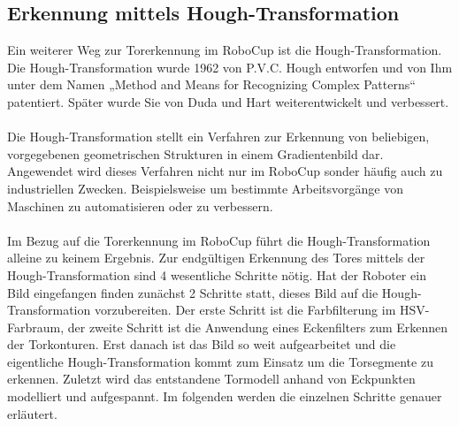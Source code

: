 \documentclass[a4paper,12pt]{article}
\begin{document}
\subsection{Erkennung mittels Hough-Transformation}
Ein weiterer Weg zur Torerkennung im RoboCup ist die Hough-Transformation.
Die Hough-Transformation wurde 1962 von P.V.C. Hough entworfen und von Ihm unter dem Namen
„Method and Means for Recognizing Complex Patterns“ patentiert. Später wurde Sie von Duda und Hart weiterentwickelt und verbessert. \\
\\
Die Hough-Transformation stellt ein Verfahren zur Erkennung von beliebigen, vorgegebenen
geometrischen Strukturen in einem Gradientenbild dar. Angewendet wird dieses Verfahren
nicht nur im RoboCup sonder häufig auch zu industriellen Zwecken. Beispielsweise um bestimmte Arbeitsvorgänge von Maschinen zu automatisieren oder zu verbessern. \\
\\
Im Bezug auf die Torerkennung im RoboCup führt die Hough-Transformation alleine zu keinem
Ergebnis. Zur endgültigen Erkennung des Tores mittels der Hough-Transformation sind 4
wesentliche Schritte nötig. Hat der Roboter ein Bild eingefangen finden zunächst 2
Schritte statt, dieses Bild auf die Hough-Transformation vorzubereiten. Der erste Schritt
ist die Farbfilterung im HSV-Farbraum, der zweite Schritt ist die Anwendung eines
Eckenfilters zum Erkennen der Torkonturen. Erst danach ist das Bild so weit aufgearbeitet und die eigentliche Hough-Transformation kommt zum Einsatz um die Torsegmente zu erkennen. Zuletzt wird das entstandene Tormodell anhand von Eckpunkten modelliert und aufgespannt. Im folgenden werden die einzelnen Schritte genauer erläutert.
\end{document}

